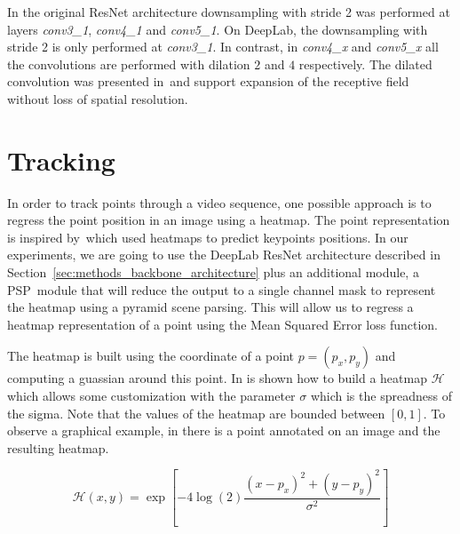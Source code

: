 In the original ResNet architecture downsampling with stride 2 was performed at layers \textit{conv3\_1}, \textit{conv4\_1} and \textit{conv5\_1}.
On DeepLab, the downsampling with stride 2 is only performed at \textit{conv3\_1}.
In contrast, in \textit{conv4\_x} and \textit{conv5\_x} all the convolutions are performed with dilation $2$ and $4$ respectively.
The dilated convolution was presented in~\dilatedconv and support expansion of the receptive field without loss of spatial resolution.


\section{Tracking}
\label{sec:methods_tracking}

In order to track points through a video sequence, one possible approach is to regress the point position in an image using a heatmap.
The point representation is inspired by~\hourglass which used heatmaps to predict keypoints positions.
In our experiments, we are going to use the DeepLab ResNet architecture described in Section~\ref{sec:methods_backbone_architecture} plus an additional module, a PSP~\pspnet module that will reduce the output to a single channel mask to represent the heatmap using a pyramid scene parsing.
This will allow us to regress a heatmap representation of a point using the Mean Squared Error loss function.

The heatmap is built using the coordinate of a point $p = (p_x, p_y)$ and computing a guassian around this point.
In  is shown how to build a heatmap $\mathcal{H}$ which allows some customization with the parameter $\sigma$ which is the spreadness of the sigma.
Note that the values of the heatmap are bounded between $[0, 1]$.
To observe a graphical example, in  there is a point annotated on an image and the resulting heatmap.

\begin{equation}
  \mathcal{H}(x, y) = \exp \left[ -4 \log(2) \frac{ (x - p_x)^2 + (y - p_y)^2 }{ \sigma^2 } \right]
  \label{eq:heatmap}
\end{equation}

